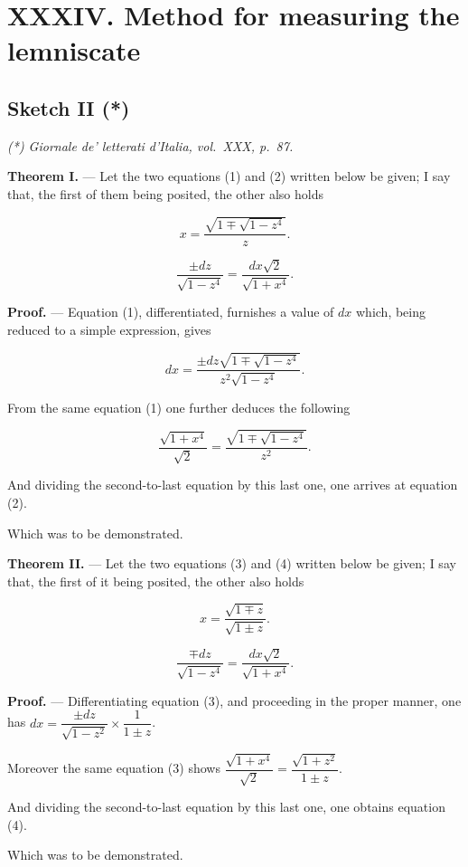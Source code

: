 \documentclass{article}
\begin{document}
\section*{XXXIV. Method for measuring the lemniscate}
\subsection*{Sketch II (*)}
\emph{(*) Giornale de' letterati d'Italia, vol.~XXX, p.~87.}

\textbf{Theorem I.} --- Let the two equations (1) and (2) written below be given; I say that,
the first of them being posited, the other also holds

\[ x = \frac{\sqrt{1 \mp \sqrt{1-z^{4}}}}{z}. \tag{1} \]

\[ \frac{\pm dz}{\sqrt{1-z^{4}}} = \frac{dx\sqrt{2}}{\sqrt{1+x^{4}}}. \tag{2} \]

\textbf{Proof.} --- Equation (1), differentiated, furnishes a value of $dx$ which, being reduced
to a simple expression, gives

\[ dx = \frac{\pm dz\sqrt{1 \mp \sqrt{1-z^{4}}}}{z^{2}\sqrt{1-z^{4}}}. \]

From the same equation (1) one further deduces the following

\[ \frac{\sqrt{1+x^{4}}}{\sqrt{2}} = \frac{\sqrt{1 \mp \sqrt{1-z^{4}}}}{z^{2}}. \]

And dividing the second-to-last equation by this last one, one arrives at equation (2).

Which was to be demonstrated.

\textbf{Theorem II.} --- Let the two equations (3) and (4) written below be given; I say that,
the first of it being posited, the other also holds

\[ x = \frac{\sqrt{1\mp z}}{\sqrt{1\pm z}}. \tag{3} \]

\[ \frac{\mp dz}{\sqrt{1-z^{4}}} = \frac{dx\sqrt{2}}{\sqrt{1+x^{4}}}. \tag{4} \]

\textbf{Proof.} --- Differentiating equation (3), and proceeding in the proper manner, one has
$dx = \dfrac{\pm dz}{\sqrt{1-z^{2}}} \times \dfrac{1}{1\pm z}$.

Moreover the same equation (3) shows $\dfrac{\sqrt{1+x^{4}}}{\sqrt{2}} = \dfrac{\sqrt{1+z^{2}}}{1\pm z}$.

And dividing the second-to-last equation by this last one, one obtains equation (4).

Which was to be demonstrated.
\end{document}
